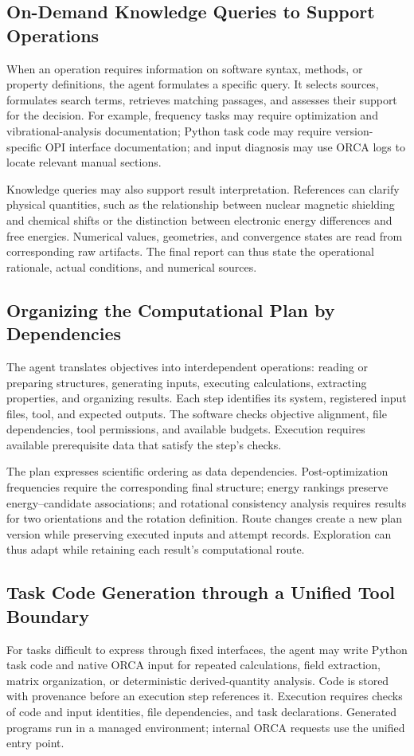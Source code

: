\subsection{On-Demand Knowledge Queries to Support Operations}
\label{sec:knowledge-retrieval}
When an operation requires information on software syntax, methods, or property definitions, the agent formulates a specific query.
It selects sources, formulates search terms, retrieves matching passages, and assesses their support for the decision.
For example, frequency tasks may require optimization and vibrational-analysis documentation; Python task code may require version-specific OPI interface documentation; and input diagnosis may use ORCA logs to locate relevant manual sections.

Knowledge queries may also support result interpretation.
References can clarify physical quantities, such as the relationship between nuclear magnetic shielding and chemical shifts or the distinction between electronic energy differences and free energies.
Numerical values, geometries, and convergence states are read from corresponding raw artifacts.
The final report can thus state the operational rationale, actual conditions, and numerical sources.

\subsection{Organizing the Computational Plan by Dependencies}
The agent translates objectives into interdependent operations: reading or preparing structures, generating inputs, executing calculations, extracting properties, and organizing results.
Each step identifies its system, registered input files, tool, and expected outputs.
The software checks objective alignment, file dependencies, tool permissions, and available budgets.
Execution requires available prerequisite data that satisfy the step's checks.

The plan expresses scientific ordering as data dependencies.
Post-optimization frequencies require the corresponding final structure; energy rankings preserve energy--candidate associations; and rotational consistency analysis requires results for two orientations and the rotation definition.
Route changes create a new plan version while preserving executed inputs and attempt records.
Exploration can thus adapt while retaining each result's computational route.

\subsection{Task Code Generation through a Unified Tool Boundary}
For tasks difficult to express through fixed interfaces, the agent may write Python task code and native ORCA input for repeated calculations, field extraction, matrix organization, or deterministic derived-quantity analysis.
Code is stored with provenance before an execution step references it.
Execution requires checks of code and input identities, file dependencies, and task declarations.
Generated programs run in a managed environment; internal ORCA requests use the unified entry point.

